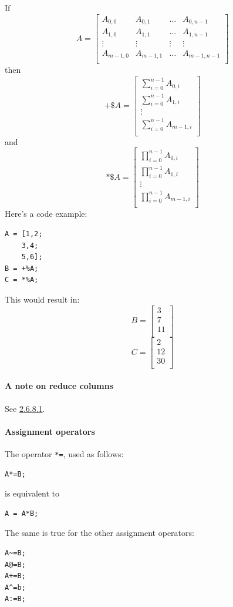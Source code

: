 If $$A=\begin{bmatrix}
A_{0,0} & A_{0,1} & \dots & A_{0,n-1}\\
A_{1,0} & A_{1,1} & \dots & A_{1,n-1}\\
\vdots&\vdots&\vdots&\vdots\\
A_{m-1,0} & A_{m-1,1} & \dots & A_{m-1,n-1}\\
\end{bmatrix}$$
then
$$+\$A=\begin{bmatrix}
\sum_{i=0}^{n-1} A_{0, i}\\
\sum_{i=0}^{n-1} A_{1, i}\\
\vdots\\
\sum_{i=0}^{n-1} A_{m-1, i}\\
\end{bmatrix}$$
and
$$*\$A=\begin{bmatrix}
\prod_{i=0}^{n-1} A_{0, i}\\
\prod_{i=0}^{n-1} A_{1, i}\\
\vdots\\
\prod_{i=0}^{n-1} A_{m-1, i}\\
\end{bmatrix}$$
Here's a code example:
\begin{lstlisting}
A = [1,2;
    3,4;
    5,6];
B = +%A;
C = *%A;
\end{lstlisting}
This would result in:
$$B=\begin{bmatrix}
3\\
7\\
11\\
\end{bmatrix}$$
$$C=\begin{bmatrix}
2\\
12\\
30\\
\end{bmatrix}$$

\paragraph{A note on reduce columns}
See \hyperref[sec:2.6.8.1]{2.6.8.1}.

\paragraph{Assignment operators}
The operator \verb|*=|, used as follows:
\begin{lstlisting}
A*=B;
\end{lstlisting}
is equivalent to
\begin{lstlisting}
A = A*B;
\end{lstlisting}
The same is true for the other assignment operators:
\begin{lstlisting}
A~=B;
A@=B;
A+=B;
A^=b;
A:=B;
\end{lstlisting}



